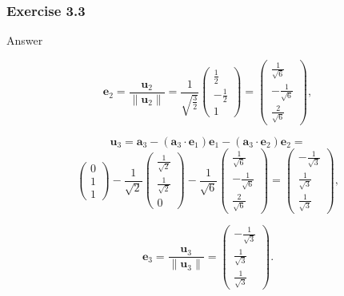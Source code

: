 \documentclass{beamer}
\begin{document}
\begin{frame}
    \frametitle{Exercise 3.3}
    \begin{block}{Answer}

\[
\mathbf{e}_2 = \frac{\mathbf{u}_2}{\|\mathbf{u}_2\|} = \frac{1}{\sqrt{\frac{3}{2}}} \begin{pmatrix} \frac{1}{2} \\ -\frac{1}{2} \\ 1 \end{pmatrix} = \begin{pmatrix} \frac{1}{\sqrt{6}} \\ -\frac{1}{\sqrt{6}} \\ \frac{2}{\sqrt{6}} \end{pmatrix},
\]

\[
\mathbf{u}_3 = \mathbf{a}_3 - (\mathbf{a}_3 \cdot \mathbf{e}_1)\mathbf{e}_1 - (\mathbf{a}_3 \cdot \mathbf{e}_2)\mathbf{e}_2 =\]
        \[
\begin{pmatrix} 0 \\ 1 \\ 1 \end{pmatrix} - \frac{1}{\sqrt{2}} \begin{pmatrix} \frac{1}{\sqrt{2}} \\ \frac{1}{\sqrt{2}} \\ 0 \end{pmatrix} - \frac{1}{\sqrt{6}} \begin{pmatrix} \frac{1}{\sqrt{6}} \\ -\frac{1}{\sqrt{6}} \\ \frac{2}{\sqrt{6}} \end{pmatrix}
= \begin{pmatrix} -\frac{1}{\sqrt{3}} \\ \frac{1}{\sqrt{3}} \\ \frac{1}{\sqrt{3}} \end{pmatrix},
\]

\[
\mathbf{e}_3 = \frac{\mathbf{u}_3}{\|\mathbf{u}_3\|} = \begin{pmatrix} -\frac{1}{\sqrt{3}} \\ \frac{1}{\sqrt{3}} \\ \frac{1}{\sqrt{3}} \end{pmatrix}.
\]
    \end{block}
\end{frame}
\end{document}
